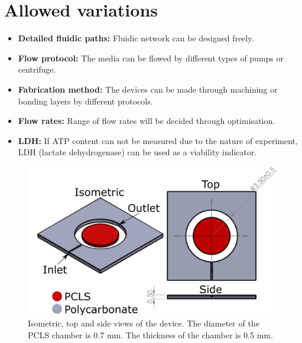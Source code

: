 \documentclass{EU-report}
\begin{document}
\section{Allowed variations}
\begin{itemize}
\item \textbf{Detailed fluidic paths:} Fluidic network can be designed freely.
\item \textbf{Flow protocol:} The media can be flowed by different types of
pumps or centrifuge.
\item \textbf{Fabrication method:} The devices can be made through machining or
bonding layers by different protocols.
\item \textbf{Flow rates:} Range of flow rates will be decided through
optimisation.
\item \textbf{LDH:} If ATP content can not be measured due to the nature of experiment, LDH (lactate dehydrogenase) can be used as a viability indicator.
\end{itemize}

\begin{figure}
\centering

\includegraphics[width=.8\linewidth,keepaspectratio=true]{./device/tisumr-device.png}
\caption{Isometric, top and side views of the device. The diameter of the PCLS
chamber is 0.7 mm. The thickness of the chamber is 0.5 mm.}
\label{fig:tisumr-device}
\end{figure}
\end{document}
